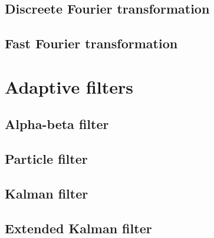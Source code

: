 \subsection{Discreete Fourier transformation}


\subsection{Fast Fourier transformation}


\section{Adaptive filters}

\subsection{Alpha-beta filter}

\subsection{Particle filter}

\subsection{Kalman filter}

\subsection{Extended Kalman filter}
